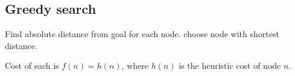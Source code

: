 
\subsection{Greedy search}

Find absolute distance from goal for each node. choose node with shortest distance.

Cost of each is \(f(n)=h(n)\), where \(h(n)\) is the heuristic cost of node \(n\).

